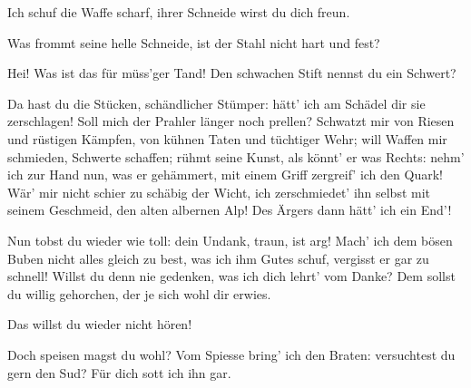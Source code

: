 \begin{drama}

Ich schuf die Waffe scharf,
ihrer Schneide wirst du dich freun.


\Siegfriedspeaks

Was frommt seine helle Schneide,
ist der Stahl nicht hart und fest?


Hei! Was ist das
für müss'ger Tand!
Den schwachen Stift
nennst du ein Schwert?


Da hast du die Stücken,
schändlicher Stümper:
hätt' ich am Schädel
dir sie zerschlagen!
Soll mich der Prahler
länger noch prellen?
Schwatzt mir von Riesen
und rüstigen Kämpfen,
von kühnen Taten
und tüchtiger Wehr;
will Waffen mir schmieden,
Schwerte schaffen;
rühmt seine Kunst,
als könnt' er was Rechts:
nehm' ich zur Hand nun,
was er gehämmert,
mit einem Griff
zergreif' ich den Quark!
Wär' mir nicht schier
zu schäbig der Wicht,
ich zerschmiedet' ihn selbst
mit seinem Geschmeid,
den alten albernen Alp!
Des Ärgers dann hätt' ich ein End'!


\Mimespeaks

Nun tobst du wieder wie toll:
dein Undank, traun, ist arg!
Mach' ich dem bösen Buben
nicht alles gleich zu best,
was ich ihm Gutes schuf,
vergisst er gar zu schnell!
Willst du denn nie gedenken,
was ich dich lehrt' vom Danke?
Dem sollst du willig gehorchen,
der je sich wohl dir erwies.


Das willst du wieder nicht hören!


Doch speisen magst du wohl?
Vom Spiesse bring' ich den Braten:
versuchtest du gern den Sud?
Für dich sott ich ihn gar.



\end{drama}
